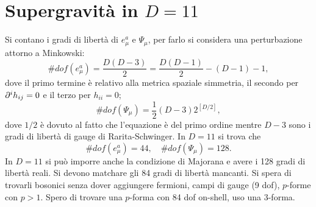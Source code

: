 \chapter{Supergravità in \texorpdfstring{$D = 11$}{D = 11}}
Si contano i gradi di libertà di $e^a_\mu$ e $\Psi_\mu$, per farlo si considera una perturbazione attorno a Minkowski:
\begin{equation}
    \#dof(e^a_\mu) = \frac{D(D - 3)}{2} = \frac{D(D - 1)}{2} - (D - 1) - 1,
\end{equation}
dove il primo termine è relativo alla metrica spaziale simmetria, il secondo per $\partial^i h_{ij} = 0$ e il terzo per $h_{ii} = 0$;
\begin{equation}
    \#dof(\Psi_\mu) = \frac{1}{2}(D - 3)2^{[D/2]},
\end{equation}
dove $1/2$ è dovuto al fatto che l'equazione è del primo ordine mentre $D - 3$ sono i gradi di libertà di gauge di Rarita-Schwinger. In $D = 11$ si trova che 
\begin{equation}
    \#dof(e^a_\mu) = 44,\quad \#dof(\Psi_\mu) = 128.
\end{equation}
In $D = 11$ si può imporre anche la condizione di Majorana e avere i 128 gradi di libertà reali. Si devono matchare gli 84 gradi di libertà mancanti. Si spera di trovarli bosonici senza dover aggiungere fermioni, campi di gauge (9 dof), $p$-forme con $p > 1$. Spero di trovare una $p$-forma con 84 dof on-shell, uso una 3-forma. 

